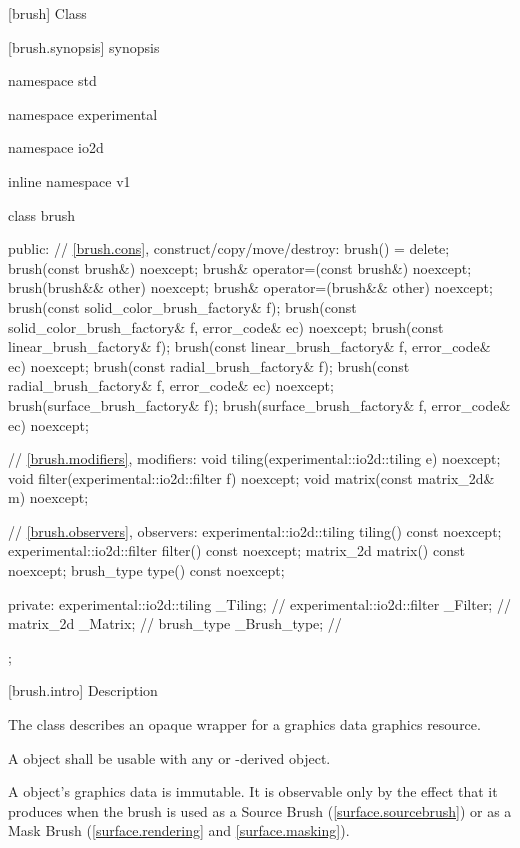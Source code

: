  [brush] {Class }

 [brush.synopsis] { synopsis}

\begin{codeblock}
namespace std { namespace experimental { namespace io2d { inline namespace v1 {
  class brush {
  public:
    // \ref{brush.cons}, construct/copy/move/destroy:
    brush() = delete;
    brush(const brush&) noexcept;
    brush& operator=(const brush&) noexcept;
    brush(brush&& other) noexcept;
    brush& operator=(brush&& other) noexcept;
    brush(const solid_color_brush_factory& f);
    brush(const solid_color_brush_factory& f, error_code& ec) noexcept;
    brush(const linear_brush_factory& f);
    brush(const linear_brush_factory& f, error_code& ec) noexcept;
    brush(const radial_brush_factory& f);
    brush(const radial_brush_factory& f, error_code& ec) noexcept;
    brush(surface_brush_factory& f);
    brush(surface_brush_factory& f, error_code& ec) noexcept;

    // \ref{brush.modifiers}, modifiers:
    void tiling(experimental::io2d::tiling e) noexcept;
    void filter(experimental::io2d::filter f) noexcept;
    void matrix(const matrix_2d& m) noexcept;

    // \ref{brush.observers}, observers:
    experimental::io2d::tiling tiling() const noexcept;
    experimental::io2d::filter filter() const noexcept;
    matrix_2d matrix() const noexcept;
    brush_type type() const noexcept;

  private:
    experimental::io2d::tiling _Tiling; // \expos
    experimental::io2d::filter _Filter; // \expos
    matrix_2d _Matrix;                         // \expos
    brush_type _Brush_type;                    // \expos
  };
} } } }
\end{codeblock}

 [brush.intro] { Description}

\pnum
{}
The class  describes an opaque wrapper for a graphics data graphics resource.

\pnum
A  object shall be usable with any  or -derived object.

\pnum
A  object's graphics data is immutable. It is observable only by the effect that it produces when the brush is used as a Source Brush (\ref{surface.sourcebrush}) or as a Mask Brush (\ref{surface.rendering} and \ref{surface.masking}).


